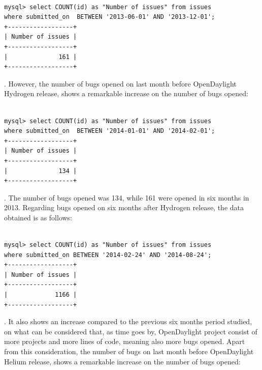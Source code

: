 \documentclass[a4paper, 12pt]{book}
\begin{document}
{\begin{verbatim}

mysql> select COUNT(id) as "Number of issues" from issues
where submitted_on  BETWEEN '2013-06-01' AND '2013-12-01';
+------------------+
| Number of issues |
+------------------+
|              161 |
+------------------+

\end{verbatim}

. However, the number of bugs opened on last month before OpenDaylight Hydrogen release, shows a remarkable increase on the number of bugs opened:

\begin{verbatim}

mysql> select COUNT(id) as "Number of issues" from issues
where submitted_on  BETWEEN '2014-01-01' AND '2014-02-01';
+------------------+
| Number of issues |
+------------------+
|              134 |
+------------------+

\end{verbatim}
. The number of bugs opened was 134, while 161 were opened in six months in 2013. Regarding bugs opened on six months after Hydrogen release, the data obtained is as follows:

\begin{verbatim}

mysql> select COUNT(id) as "Number of issues" from issues
where submitted_on BETWEEN '2014-02-24' AND '2014-08-24';
+------------------+
| Number of issues |
+------------------+
|             1166 |
+------------------+

\end{verbatim}

. It also shows an increase compared to the previous six months period studied, on what can be considered that, as time goes by, OpenDaylight project consist of more projects and more lines of code, meaning also more bugs opened. Apart from this consideration, the number of bugs on last month before OpenDaylight Helium release, shows a remarkable increase on the number of bugs opened:

\begin{verbatim}


\end{verbatim}}
\end{document}
